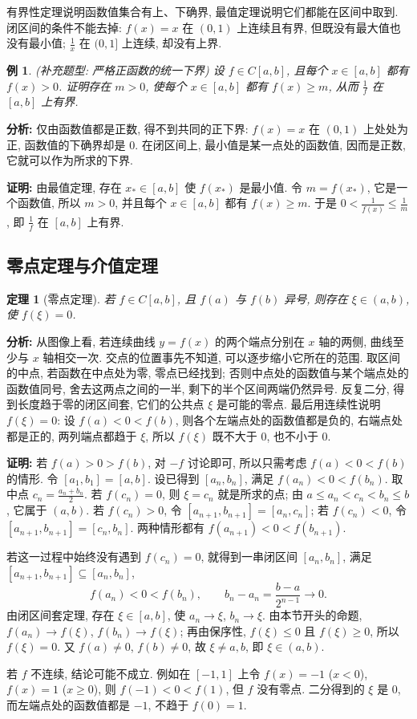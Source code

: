 \documentclass[UTF8,openany]{ctexbook}
\theoremstyle{chinesetextbook}
\newtheorem{example}{例}[section]
\newtheorem{theorem}{定理}[section]
\newenvironment{cnproof}{\par\indent\textbf{证明:} \ignorespaces}{\par}
\begin{document}
有界性定理说明函数值集合有上、下确界, 最值定理说明它们都能在区间中取到. 闭区间的条件不能去掉: $f(x)=x$ 在 $(0,1)$ 上连续且有界, 但既没有最大值也没有最小值; $\displaystyle\frac1x$ 在 $(0,1]$ 上连续, 却没有上界.
\begin{example}
\textnormal{(补充题型: 严格正函数的统一下界)} 设 $f\in C[a,b]$, 且每个 $x\in[a,b]$ 都有 $f(x)>0$. 证明存在 $m>0$, 使每个 $x\in[a,b]$ 都有 $f(x)\ge m$, 从而 $\displaystyle\frac1f$ 在 $[a,b]$ 上有界.
\end{example}
\par\indent\textbf{分析:} 仅由函数值都是正数, 得不到共同的正下界: $f(x)=x$ 在 $(0,1)$ 上处处为正, 函数值的下确界却是 $0$. 在闭区间上, 最小值是某一点处的函数值, 因而是正数, 它就可以作为所求的下界.
\begin{cnproof}
由最值定理, 存在 $x_*\in[a,b]$ 使 $f(x_*)$ 是最小值. 令 $m=f(x_*)$, 它是一个函数值, 所以 $m>0$, 并且每个 $x\in[a,b]$ 都有 $f(x)\ge m$. 于是 $\displaystyle0<\frac1{f(x)}\le\frac1m$, 即 $\displaystyle\frac1f$ 在 $[a,b]$ 上有界.
\end{cnproof}
\subsection{零点定理与介值定理}
\begin{theorem}[零点定理]
若 $f\in C[a,b]$, 且 $f(a)$ 与 $f(b)$ 异号, 则存在 $\xi\in(a,b)$, 使 $f(\xi)=0$.
\end{theorem}
\par\indent\textbf{分析:} 从图像上看, 若连续曲线 $y=f(x)$ 的两个端点分别在 $x$ 轴的两侧, 曲线至少与 $x$ 轴相交一次. 交点的位置事先不知道, 可以逐步缩小它所在的范围. 取区间的中点, 若函数在中点处为零, 零点已经找到; 否则中点处的函数值与某个端点处的函数值同号, 舍去这两点之间的一半, 剩下的半个区间两端仍然异号. 反复二分, 得到长度趋于零的闭区间套, 它们的公共点 $\xi$ 是可能的零点. 最后用连续性说明 $f(\xi)=0$: 设 $f(a)<0<f(b)$, 则各个左端点处的函数值都是负的, 右端点处都是正的, 两列端点都趋于 $\xi$, 所以 $f(\xi)$ 既不大于 $0$, 也不小于 $0$.
\begin{cnproof}
若 $f(a)>0>f(b)$, 对 $-f$ 讨论即可, 所以只需考虑 $f(a)<0<f(b)$ 的情形. 令 $[a_1,b_1]=[a,b]$. 设已得到 $[a_n,b_n]$, 满足 $f(a_n)<0<f(b_n)$. 取中点 $\displaystyle c_n=\frac{a_n+b_n}2$. 若 $f(c_n)=0$, 则 $\xi=c_n$ 就是所求的点; 由 $a\le a_n<c_n<b_n\le b$, 它属于 $(a,b)$. 若 $f(c_n)>0$, 令 $[a_{n+1},b_{n+1}]=[a_n,c_n]$; 若 $f(c_n)<0$, 令 $[a_{n+1},b_{n+1}]=[c_n,b_n]$. 两种情形都有 $f(a_{n+1})<0<f(b_{n+1})$.

若这一过程中始终没有遇到 $f(c_n)=0$, 就得到一串闭区间 $[a_n,b_n]$, 满足 $[a_{n+1},b_{n+1}]\subseteq[a_n,b_n]$,
\[
f(a_n)<0<f(b_n),\qquad b_n-a_n=\frac{b-a}{2^{n-1}}\to0.
\]
由闭区间套定理, 存在 $\xi\in[a,b]$, 使 $a_n\to\xi$, $b_n\to\xi$. 由本节开头的命题, $f(a_n)\to f(\xi)$, $f(b_n)\to f(\xi)$; 再由保序性, $f(\xi)\le0$ 且 $f(\xi)\ge0$, 所以 $f(\xi)=0$. 又 $f(a)\ne0$, $f(b)\ne0$, 故 $\xi\ne a,b$, 即 $\xi\in(a,b)$.
\end{cnproof}
若 $f$ 不连续, 结论可能不成立. 例如在 $[-1,1]$ 上令 $f(x)=-1$ ($x<0$), $f(x)=1$ ($x\ge0$), 则 $f(-1)<0<f(1)$, 但 $f$ 没有零点. 二分得到的 $\xi$ 是 $0$, 而左端点处的函数值都是 $-1$, 不趋于 $f(0)=1$.
\end{document}
